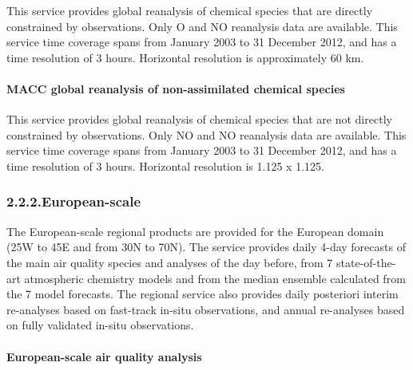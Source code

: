 \documentclass[9pt]{report}
\begin{document}
\noindent{}This service provides global reanalysis of chemical species that are directly constrained by observations.
Only O and NO reanalysis data are available. 
This service time coverage spans from January 2003 to 31 December 2012, and has a time resolution of 3 hours.
Horizontal resolution is approximately 60 km.%

\paragraph{MACC global reanalysis of non-assimilated chemical species}\label{sec-macc-global-reanalysis-of-non-assimilated-chemical-species}%

\noindent{}This service provides global reanalysis of chemical species that are not directly constrained by observations. 
Only NO and NO reanalysis data are available. 
This service time coverage spans from January 2003 to 31 December 2012, and has a time resolution of 3 hours.
Horizontal resolution is 1.125\textdegree{} x 1.125\textdegree{}.%

\subsubsection{2.2.2.\hspace*{0.5em}European-scale}\label{sec-european-scale}%

\noindent{}The European-scale regional products are provided for the European domain (25\textdegree{}W to 45\textdegree{}E and from 30\textdegree{}N to 70\textdegree{}N). 
The service provides daily 4-day forecasts of the main air quality species and analyses of the day before, from 7 state-of-the-art atmospheric chemistry models and from the median ensemble calculated from the 7 model forecasts. 
The regional service also provides daily posteriori interim re-analyses based on fast-track in-situ observations, and annual re-analyses based on fully validated in-situ observations.%

\paragraph{European-scale air quality analysis}\label{sec-european-scale-air-quality-analysis}%
\end{document}

